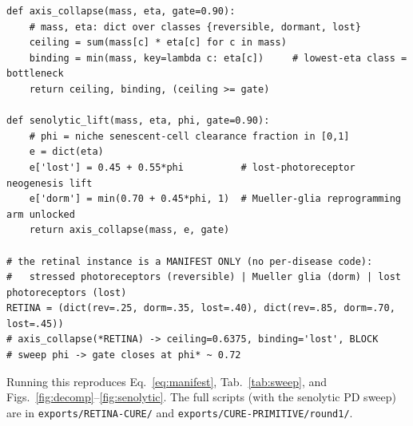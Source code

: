 \documentclass[11pt,a4paper]{article}
\begin{document}
\begin{lstlisting}[basicstyle=\ttfamily\footnotesize,frame=single,xleftmargin=0pt,breaklines=true]
def axis_collapse(mass, eta, gate=0.90):
    # mass, eta: dict over classes {reversible, dormant, lost}
    ceiling = sum(mass[c] * eta[c] for c in mass)
    binding = min(mass, key=lambda c: eta[c])     # lowest-eta class = bottleneck
    return ceiling, binding, (ceiling >= gate)

def senolytic_lift(mass, eta, phi, gate=0.90):
    # phi = niche senescent-cell clearance fraction in [0,1]
    e = dict(eta)
    e['lost'] = 0.45 + 0.55*phi          # lost-photoreceptor neogenesis lift
    e['dorm'] = min(0.70 + 0.45*phi, 1)  # Mueller-glia reprogramming arm unlocked
    return axis_collapse(mass, e, gate)

# the retinal instance is a MANIFEST ONLY (no per-disease code):
#   stressed photoreceptors (reversible) | Mueller glia (dorm) | lost photoreceptors (lost)
RETINA = (dict(rev=.25, dorm=.35, lost=.40), dict(rev=.85, dorm=.70, lost=.45))
# axis_collapse(*RETINA) -> ceiling=0.6375, binding='lost', BLOCK
# sweep phi -> gate closes at phi* ~ 0.72
\end{lstlisting}

\noindent Running this reproduces Eq.~\eqref{eq:manifest}, Tab.~\ref{tab:sweep}, and
Figs.~\ref{fig:decomp}--\ref{fig:senolytic}. The full scripts (with the senolytic PD sweep)
are in \texttt{exports/RETINA-CURE/} and \texttt{exports/CURE-PRIMITIVE/round1/}.



\end{document}

